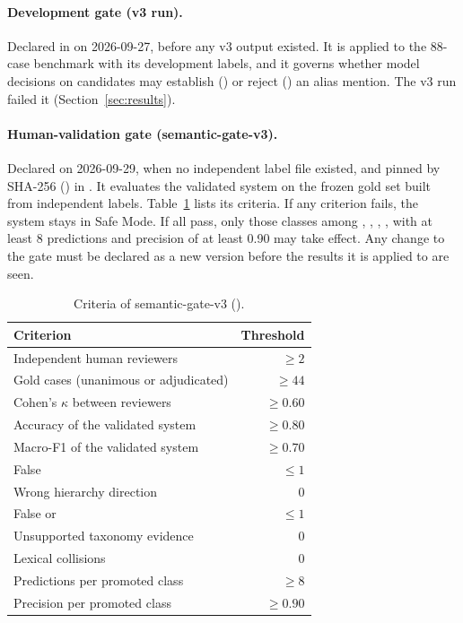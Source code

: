 \paragraph{Development gate (v3 run).} Declared in  on 2026-09-27, before any v3 output existed. It is applied to the 88-case benchmark with its development labels, and it governs whether model decisions on  candidates may establish (\SC) or reject (\UN) an alias mention. The v3 run failed it (Section~\ref{sec:results}).

\paragraph{Human-validation gate (semantic-gate-v3).} Declared on 2026-09-29, when no independent label file existed, and pinned by SHA-256 () in . It evaluates the validated system on the frozen gold set built from independent labels. Table~\ref{tab:gate} lists its criteria. If any criterion fails, the system stays in Safe Mode. If all pass, only those classes among \SC, \UN, \PA, \CH, \RE{} with at least 8 predictions and precision of at least 0.90 may take effect. Any change to the gate must be declared as a new version before the results it is applied to are seen.

\begin{table}[H]
\centering
\small
\begin{tabular}{@{}lr@{}}
\toprule
\textbf{Criterion} & \textbf{Threshold} \\
\midrule
Independent human reviewers & $\geq 2$ \\
Gold cases (unanimous or adjudicated) & $\geq 44$ \\
Cohen's $\kappa$ between reviewers & $\geq 0.60$ \\
Accuracy of the validated system & $\geq 0.80$ \\
Macro-F1 of the validated system & $\geq 0.70$ \\
False \SC{} & $\leq 1$ \\
Wrong hierarchy direction & $0$ \\
False \PA{} or \CH{} & $\leq 1$ \\
Unsupported taxonomy evidence & $0$ \\
Lexical collisions & $0$ \\
Predictions per promoted class & $\geq 8$ \\
Precision per promoted class & $\geq 0.90$ \\
\bottomrule
\end{tabular}
\caption[{Criteria of semantic-gate-v3}]{Criteria of semantic-gate-v3 ().}
\label{tab:gate}
\end{table}

